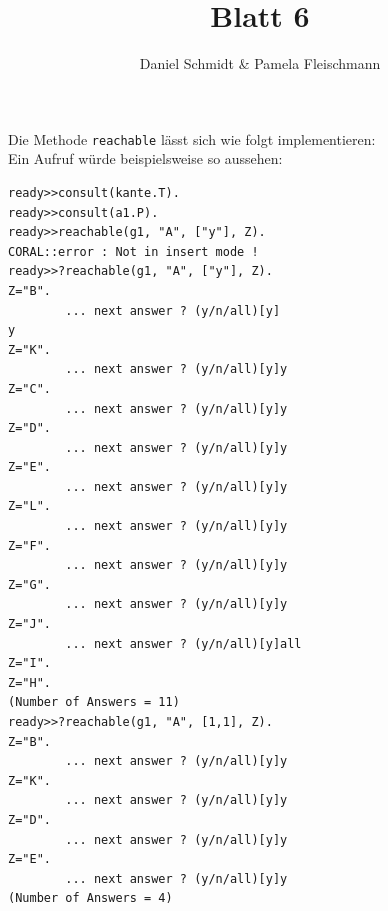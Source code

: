 \documentclass[12pt,a4paper]{amsart}
\begin{document}
\title{Blatt 6}

\author{Daniel Schmidt \& Pamela Fleischmann}

\maketitle

\begin{aufgabe1}

Die Methode \texttt{reachable} lässt sich wie folgt implementieren: \\



Ein Aufruf würde beispielsweise so aussehen: \\

\begin{lstlisting}
ready>>consult(kante.T).
ready>>consult(a1.P).
ready>>reachable(g1, "A", ["y"], Z).
CORAL::error : Not in insert mode !
ready>>?reachable(g1, "A", ["y"], Z).
Z="B".
        ... next answer ? (y/n/all)[y]
y
Z="K".
        ... next answer ? (y/n/all)[y]y
Z="C".
        ... next answer ? (y/n/all)[y]y
Z="D".
        ... next answer ? (y/n/all)[y]y
Z="E".
        ... next answer ? (y/n/all)[y]y
Z="L".
        ... next answer ? (y/n/all)[y]y
Z="F".
        ... next answer ? (y/n/all)[y]y
Z="G".
        ... next answer ? (y/n/all)[y]y
Z="J".
        ... next answer ? (y/n/all)[y]all
Z="I".
Z="H".
(Number of Answers = 11)
ready>>?reachable(g1, "A", [1,1], Z).
Z="B".
        ... next answer ? (y/n/all)[y]y
Z="K".
        ... next answer ? (y/n/all)[y]y
Z="D".
        ... next answer ? (y/n/all)[y]y
Z="E".
        ... next answer ? (y/n/all)[y]y
(Number of Answers = 4)
\end{lstlisting}

\end{aufgabe1}
\end{document}
